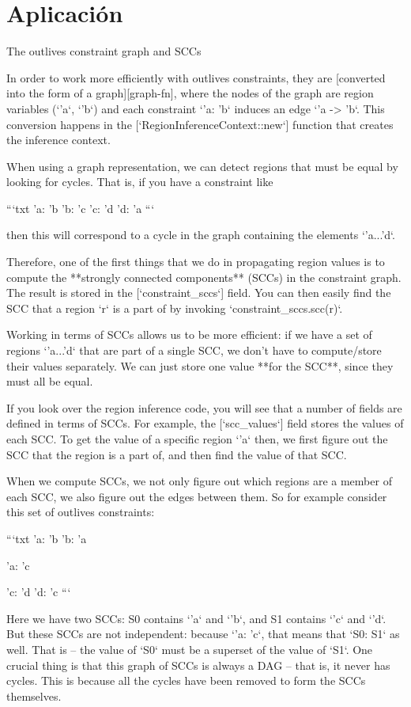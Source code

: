 \documentclass[11pt, a4paper]{article}
\begin{document}
\section{Aplicación}

The outlives constraint graph and SCCs

In order to work more efficiently with outlives constraints, they are
[converted into the form of a graph][graph-fn], where the nodes of the
graph are region variables (`'a`, `'b`) and each constraint `'a: 'b`
induces an edge `'a -> 'b`. This conversion happens in the
[`RegionInferenceContext::new`] function that creates the inference
context.

When using a graph representation, we can detect regions that must be equal
by looking for cycles. That is, if you have a constraint like

```txt
'a: 'b
'b: 'c
'c: 'd
'd: 'a
```

then this will correspond to a cycle in the graph containing the
elements `'a...'d`.

Therefore, one of the first things that we do in propagating region
values is to compute the **strongly connected components** (SCCs) in
the constraint graph. The result is stored in the [`constraint\_sccs`]
field. You can then easily find the SCC that a region `r` is a part of
by invoking `constraint\_sccs.scc(r)`.

Working in terms of SCCs allows us to be more efficient: if we have a
set of regions `'a...'d` that are part of a single SCC, we don't have
to compute/store their values separately. We can just store one value
**for the SCC**, since they must all be equal.

If you look over the region inference code, you will see that a number
of fields are defined in terms of SCCs. For example, the
[`scc\_values`] field stores the values of each SCC. To get the value
of a specific region `'a` then, we first figure out the SCC that the
region is a part of, and then find the value of that SCC.

When we compute SCCs, we not only figure out which regions are a
member of each SCC, we also figure out the edges between them. So for example
consider this set of outlives constraints:

```txt
'a: 'b
'b: 'a

'a: 'c

'c: 'd
'd: 'c
```

Here we have two SCCs: S0 contains `'a` and `'b`, and S1 contains `'c`
and `'d`.  But these SCCs are not independent: because `'a: 'c`, that
means that `S0: S1` as well. That is -- the value of `S0` must be a
superset of the value of `S1`. One crucial thing is that this graph of
SCCs is always a DAG -- that is, it never has cycles. This is because
all the cycles have been removed to form the SCCs themselves.
\end{document}
